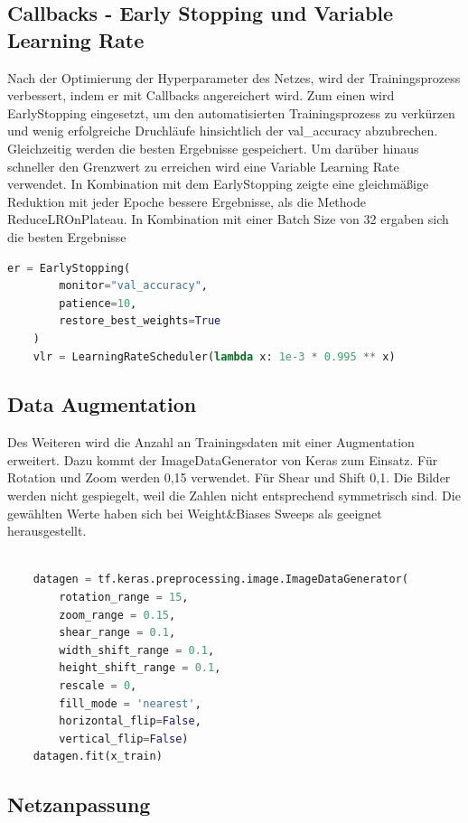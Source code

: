 \documentclass[
fontsize=12pt,					%
paper=a4,						%
twoside=true, 					%
listof=totoc, 					%
bibliography=totoc,				%
titlepage, 						%
headsepline, 					%
DIV=12,							%
BCOR=6mm,						%
cleardoublepage=empty,			%
parskip,							%
ngerman
]{scrartcl}
\begin{document}
\subsection{Callbacks - Early Stopping und Variable Learning Rate}

Nach der Optimierung der Hyperparameter des Netzes, wird der Trainingsprozess verbessert, indem er mit Callbacks angereichert wird. Zum einen wird EarlyStopping eingesetzt, um den automatisierten Trainingsprozess zu verkürzen und wenig erfolgreiche Druchläufe hinsichtlich der val\_accuracy abzubrechen. Gleichzeitig werden die besten Ergebnisse gespeichert. Um darüber hinaus schneller den Grenzwert zu erreichen wird eine Variable Learning Rate verwendet. In Kombination mit dem EarlyStopping zeigte eine gleichmäßige Reduktion mit jeder Epoche bessere Ergebnisse, als die Methode ReduceLROnPlateau. In Kombination mit einer Batch Size von 32 ergaben sich die besten Ergebnisse

\begin{lstlisting}[language=Python, caption=Callbacks, label=callback]
	er = EarlyStopping(
		monitor="val_accuracy",
		patience=10,
	    restore_best_weights=True
	)
	vlr = LearningRateScheduler(lambda x: 1e-3 * 0.995 ** x)
\end{lstlisting}

\subsection{Data Augmentation}

Des Weiteren wird die Anzahl an Trainingsdaten mit einer Augmentation erweitert. Dazu kommt der ImageDataGenerator von Keras zum Einsatz. Für Rotation und Zoom werden 0,15 verwendet. Für Shear und Shift 0,1. Die Bilder werden nicht gespiegelt, weil die Zahlen nicht entsprechend symmetrisch sind. Die gewählten Werte haben sich bei Weight\&Biases Sweeps als geeignet herausgestellt.

\begin{lstlisting}[language=Python, caption=Data Augmentation, label=da]
	
	datagen = tf.keras.preprocessing.image.ImageDataGenerator(
		rotation_range = 15,
		zoom_range = 0.15,
		shear_range = 0.1,
		width_shift_range = 0.1,
		height_shift_range = 0.1,
		rescale = 0,
		fill_mode = 'nearest',
		horizontal_flip=False,
		vertical_flip=False)
	datagen.fit(x_train)

\end{lstlisting}

\subsection{Netzanpassung}
\end{document}
